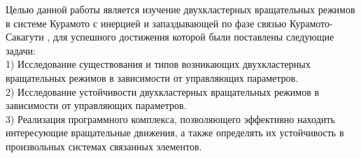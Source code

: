 Целью данной работы является изучение двухкластерных вращательных режимов в системе Курамото
с инерцией и запаздывающей по фазе связью Курамото-Сакагути \cite{Sakaguchi}, для успешного достижения которой были поставлены следующие задачи: \\
1) Исследование существования и типов возникающих двухкластерных вращательных режимов в зависимости от управляющих параметров. \\
2) Исследование устойчивости двухкластерных вращательных режимов в зависимости от управляющих параметров. \\
3) Реализация программного комплекса, позволяющего эффективно находить интересующие вращательные движения, а также определять
их устойчивость в произвольных системах связанных элементов.
